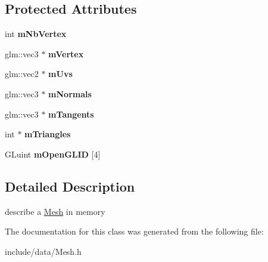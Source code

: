 \subsection*{\-Protected \-Attributes}
\begin{DoxyCompactItemize}
\item 
\hypertarget{classde_1_1data_1_1_mesh_aaf7d203e50bc556bdfac1e7222a9f199}{
int {\bfseries m\-Nb\-Vertex}}
\label{classde_1_1data_1_1_mesh_aaf7d203e50bc556bdfac1e7222a9f199}

\item 
\hypertarget{classde_1_1data_1_1_mesh_ae9dfb01b5452dadb9f6398f0b53e9f7d}{
glm\-::vec3 $\ast$ {\bfseries m\-Vertex}}
\label{classde_1_1data_1_1_mesh_ae9dfb01b5452dadb9f6398f0b53e9f7d}

\item 
\hypertarget{classde_1_1data_1_1_mesh_a4c6bbbf777959b963e7bfc24838e78df}{
glm\-::vec2 $\ast$ {\bfseries m\-Uvs}}
\label{classde_1_1data_1_1_mesh_a4c6bbbf777959b963e7bfc24838e78df}

\item 
\hypertarget{classde_1_1data_1_1_mesh_abc3e63ff9f0a159685f556aa87ce5762}{
glm\-::vec3 $\ast$ {\bfseries m\-Normals}}
\label{classde_1_1data_1_1_mesh_abc3e63ff9f0a159685f556aa87ce5762}

\item 
\hypertarget{classde_1_1data_1_1_mesh_a6f24ff8a3176033e6a09917a405db02d}{
glm\-::vec3 $\ast$ {\bfseries m\-Tangents}}
\label{classde_1_1data_1_1_mesh_a6f24ff8a3176033e6a09917a405db02d}

\item 
\hypertarget{classde_1_1data_1_1_mesh_af7522383c4508f0a82b27690fb36335d}{
int $\ast$ {\bfseries m\-Triangles}}
\label{classde_1_1data_1_1_mesh_af7522383c4508f0a82b27690fb36335d}

\item 
\hypertarget{classde_1_1data_1_1_mesh_ac35a2fe325686b438b09430cf827e9fe}{
\-G\-Luint {\bfseries m\-Open\-G\-L\-I\-D} \mbox{[}4\mbox{]}}
\label{classde_1_1data_1_1_mesh_ac35a2fe325686b438b09430cf827e9fe}

\end{DoxyCompactItemize}


\subsection{\-Detailed \-Description}
describe a \hyperlink{classde_1_1data_1_1_mesh}{\-Mesh} in memory 

\-The documentation for this class was generated from the following file\-:\begin{DoxyCompactItemize}
\item 
include/data/\-Mesh.\-h\end{DoxyCompactItemize}

